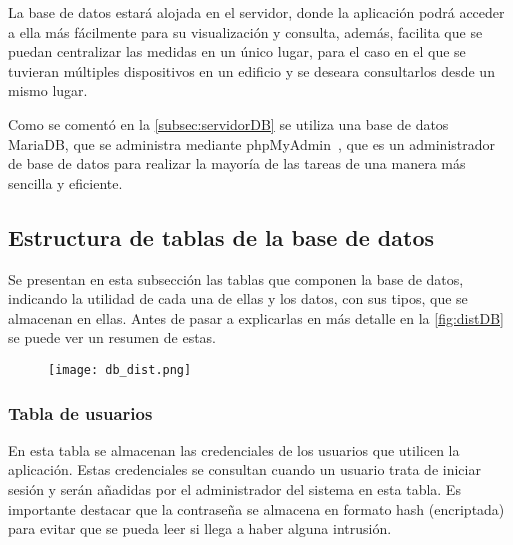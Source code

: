 La base de datos estará alojada en el servidor, donde la aplicación podrá acceder a ella más fácilmente para su visualización y consulta, además, facilita que se puedan centralizar las medidas en un único lugar, para el caso en el que se tuvieran múltiples dispositivos en un edificio y se deseara consultarlos desde un mismo lugar.

Como se comentó en la \autoref{subsec:servidorDB} se utiliza una base de datos MariaDB, que se administra mediante phpMyAdmin~\cite{noauthor_phpmyadmin_nodate}, que es un administrador de base de datos para realizar la mayoría de las tareas de una manera más sencilla y eficiente.

\subsection{Estructura de tablas de la base de datos}\label{subsec:estructura-de-tablas-de-la-base-de-datos}
Se presentan en esta subsección las tablas que componen la base de datos, indicando la utilidad de cada una de ellas y los datos, con sus tipos, que se almacenan en ellas. Antes de pasar a explicarlas en más detalle en la \autoref{fig:distDB} se puede ver un resumen de estas.
\begin{figure}[H]
	{\texttt{[image: db\_dist.png]}}
\end{figure}
\subsubsection{Tabla de usuarios}
En esta tabla se almacenan las credenciales de los usuarios que utilicen la aplicación. Estas credenciales se consultan cuando un usuario trata de iniciar sesión y serán añadidas por el administrador del sistema en esta tabla. Es importante destacar que la contraseña se almacena en formato hash (encriptada) para evitar que se pueda leer si llega a haber alguna intrusión. 
\pagebreak

